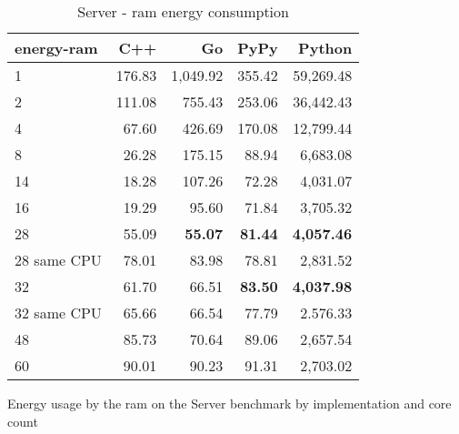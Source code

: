 \begin{table}[H]
    \centering
    \begin{tabular}{lrrrr}
        \hline
        energy-ram   & C++             & Go                & PyPy                & Python            \\
        \hline      
        1            &   176.83        & 1,049.92          &   355.42            &  59,269.48        \\
        2            &   111.08        &   755.43          &   253.06            &  36,442.43        \\
        4            &    67.60        &   426.69          &   170.08            &  12,799.44        \\
        8	         &    26.28 	   &   175.15          &    88.94            &	  6,683.08       \\
        14           &    18.28        &   107.26          &    72.28            &   4,031.07        \\
        16           &    19.29        &    95.60          &    71.84            &   3,705.32        \\
        28           & 55.09           &    \textbf{55.07} &    \textbf{81.44}   & \textbf{4,057.46} \\
        28 same CPU  & 78.01           &    83.98          &    78.81            &   2,831.52        \\
        32           & 61.70           &    66.51          &    \textbf{83.50}   & \textbf{4,037.98} \\
        32 same CPU  & 65.66           &    66.54          &    77.79            &   2.576.33        \\
        48           & 85.73           &    70.64          &    89.06            &   2,657.54        \\
        60           & 90.01           &    90.23          &    91.31            &   2,703.02        \\
        \hline
    \end{tabular}
\caption{Server - \gls{ram} energy consumption}{Energy usage by the \gls{ram} on the Server benchmark by implementation and core count}
\label{tab:server-energy-ram}
\end{table}

